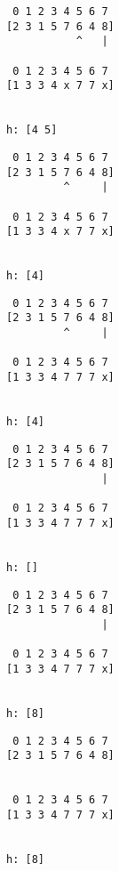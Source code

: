{ \begin{verbatim}
                    0 1 2 3 4 5 6 7
                   [2 3 1 5 7 6 4 8]
                              ^   |

                    0 1 2 3 4 5 6 7
                   [1 3 3 4 x 7 7 x]


                   h: [4 5]
\end{verbatim} }

{ \begin{verbatim}
                    0 1 2 3 4 5 6 7
                   [2 3 1 5 7 6 4 8]
                            ^     |

                    0 1 2 3 4 5 6 7
                   [1 3 3 4 x 7 7 x]


                   h: [4]
\end{verbatim} }

{ \begin{verbatim}
                    0 1 2 3 4 5 6 7
                   [2 3 1 5 7 6 4 8]
                            ^     |

                    0 1 2 3 4 5 6 7
                   [1 3 3 4 7 7 7 x]


                   h: [4]
\end{verbatim} }

{ \begin{verbatim}
                    0 1 2 3 4 5 6 7
                   [2 3 1 5 7 6 4 8]
                                  |

                    0 1 2 3 4 5 6 7
                   [1 3 3 4 7 7 7 x]


                   h: []
\end{verbatim} }

{ \begin{verbatim}
                    0 1 2 3 4 5 6 7
                   [2 3 1 5 7 6 4 8]
                                  |

                    0 1 2 3 4 5 6 7
                   [1 3 3 4 7 7 7 x]


                   h: [8]
\end{verbatim} }

{ \begin{verbatim}
                    0 1 2 3 4 5 6 7
                   [2 3 1 5 7 6 4 8]
                   

                    0 1 2 3 4 5 6 7
                   [1 3 3 4 7 7 7 x]


                   h: [8]
\end{verbatim} }

